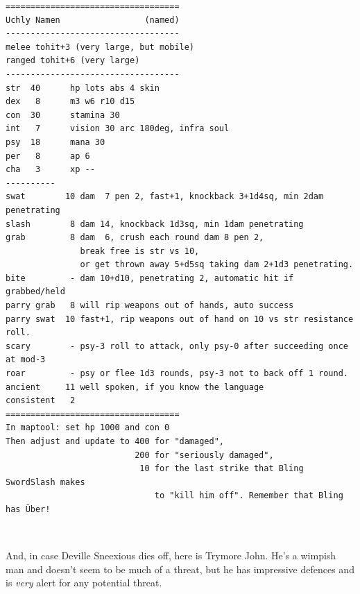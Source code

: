 \goodbreak \begin{samepage} \small \begin{verbatim}
===================================
Uchly Namen                 (named)
-----------------------------------
melee tohit+3 (very large, but mobile)
ranged tohit+6 (very large)
-----------------------------------
str  40      hp lots abs 4 skin
dex   8      m3 w6 r10 d15
con  30      stamina 30
int   7      vision 30 arc 180deg, infra soul
psy  18      mana 30
per   8      ap 6
cha   3      xp --
----------
swat        10 dam  7 pen 2, fast+1, knockback 3+1d4sq, min 2dam penetrating
slash        8 dam 14, knockback 1d3sq, min 1dam penetrating
grab         8 dam  6, crush each round dam 8 pen 2,
               break free is str vs 10,
               or get thrown away 5+d5sq taking dam 2+1d3 penetrating.
bite         - dam 10+d10, penetrating 2, automatic hit if grabbed/held
parry grab   8 will rip weapons out of hands, auto success
parry swat  10 fast+1, rip weapons out of hand on 10 vs str resistance roll.
scary        - psy-3 roll to attack, only psy-0 after succeeding once at mod-3
roar         - psy or flee 1d3 rounds, psy-3 not to back off 1 round.
ancient     11 well spoken, if you know the language
consistent   2
===================================
In maptool: set hp 1000 and con 0
Then adjust and update to 400 for "damaged",
                          200 for "seriously damaged",
                           10 for the last strike that Bling SwordSlash makes
                              to "kill him off". Remember that Bling has Über!
\end{verbatim} \normalsize \end{samepage}

\

And, in case Deville Sneexious dies off, here is Trymore John. He's a wimpish man and doesn't seem to be much of a threat, but he has impressive defences and is \emph{very} alert for any potential threat.

